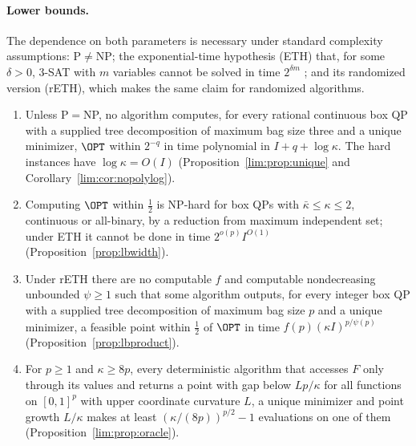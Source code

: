 \paragraph{Lower bounds.}
The dependence on both parameters is necessary under standard complexity
assumptions: P${}\ne{}$NP; the exponential-time hypothesis (ETH) that, for
some $\delta>0$, 3-SAT with $m$ variables cannot be solved in time
$2^{\delta m}$ \cite{ImpagliazzoPaturiZane2001}; and its randomized version
(rETH), which makes the same claim for randomized algorithms.

\begin{theorem}\label{thm:intro-lower}
\leavevmode
\begin{enumerate}[label=(\alph*)]
\item Unless P${}={}$NP, no algorithm computes, for every rational continuous
box QP with a supplied tree decomposition of maximum bag size three and a
unique minimizer, $\OPT$ within $2^{-q}$ in time polynomial in
$I+q+\log\kappa$. The hard instances have $\log\kappa=O(I)$
(Proposition~\ref{lim:prop:unique} and Corollary~\ref{lim:cor:nopolylog}).
\item Computing $\OPT$ within $\frac12$ is NP-hard for box QPs with
$\bar\kappa\le\kappa\le2$, continuous or all-binary, by a reduction from
maximum independent set; under ETH it cannot be done in time
$2^{o(p)}I^{O(1)}$ (Proposition~\ref{prop:lbwidth}).
\item Under rETH there are no computable $f$ and computable nondecreasing
unbounded $\psi\ge1$ such that some algorithm outputs, for every integer box QP
with a supplied tree decomposition of maximum bag size $p$ and a unique
minimizer, a feasible point
within $\frac12$ of $\OPT$ in time $f(p)(\kappa I)^{p/\psi(p)}$
(Proposition~\ref{prop:lbproduct}).
\item For $p\ge1$ and $\kappa\ge8p$, every deterministic algorithm that
accesses $F$ only through its values and returns a point with gap below
$Lp/\kappa$ for all functions on $[0,1]^p$ with upper coordinate curvature $L$, a
unique minimizer and point growth $L/\kappa$ makes at least
$(\kappa/(8p))^{p/2}-1$ evaluations on one of them
(Proposition~\ref{lim:prop:oracle}).
\end{enumerate}
\end{theorem}

